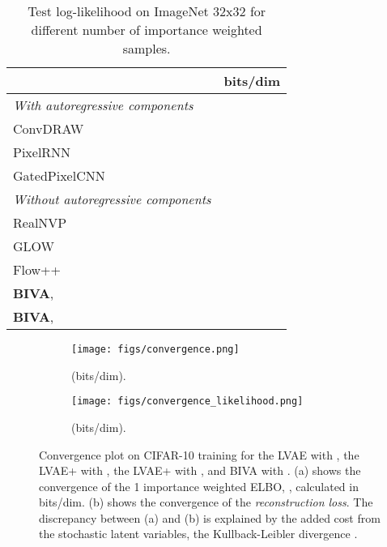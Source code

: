 \documentclass{article}
\def\nm{BIVA\xspace}
\def\abovestrut#1{\rule[0in]{0in}{#1}\ignorespaces}
\def\abovespace{\abovestrut{0.20in}}
\begin{document}
\begin{table}[h!]
\renewcommand\figurename{Table}
\begin{center}
\begin{small}
\begin{sc}
\caption{Test log-likelihood on ImageNet 32x32
for different number of importance weighted samples.
}\label{table:imagenet}
\begin{tabular}{l c}
 & bits/dim \\
\hline
\textit{With autoregressive components} \\
ConvDRAW {\scriptsize\cite{Gregor16}} & \\
PixelRNN {\scriptsize\cite{Oord2015}} & \\
GatedPixelCNN {\scriptsize\cite{Oord16}} & \\
\hline
 \textit{Without autoregressive components} \\
RealNVP {\scriptsize\cite{Dinh16}} & \\
GLOW {\scriptsize\cite{Kingma18}} & \\
Flow++ {\scriptsize\cite{Ho19}} & \\
\abovespace
\textbf{\nm},  &  \\
\textbf{\nm},  &  \\
\hline
\end{tabular}\end{sc}
\end{small}
\end{center}
	\vspace*{-0.6cm}
\end{table} 


\begin{figure}[!h]
\begin{subfigure}{0.49\textwidth}
\centering
\texttt{[image: figs/convergence.png]}
\caption{ (bits/dim).}
\label{fig:convergence}
\end{subfigure}
\begin{subfigure}{0.49\textwidth}
\centering
\texttt{[image: figs/convergence\_likelihood.png]}
\caption{ (bits/dim).}
\label{fig:convergence2}
\end{subfigure}
\caption{Convergence plot on CIFAR-10 training for the LVAE with , the LVAE+ with , the LVAE+ with , and \nm with . (a) shows the convergence of the 1 importance weighted ELBO, , calculated in bits/dim. (b) shows the convergence of the \textit{reconstruction loss}. The discrepancy between (a) and (b) is explained by the added cost from the stochastic latent variables, the Kullback-Leibler divergence .}
\end{figure}
\end{document}
